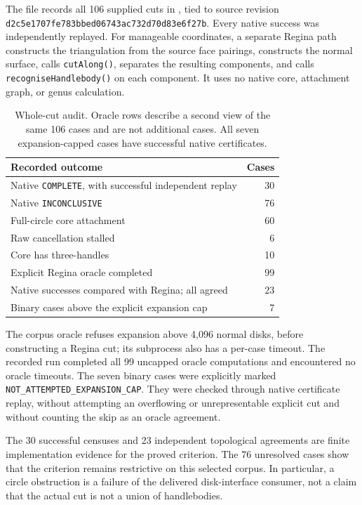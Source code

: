 The file  records all 106 supplied cuts in
, tied to source revision
\texttt{d2c5e1707fe783bbed06743ac732d70d83e6f27b}.  Every native success was
independently replayed.  For manageable coordinates, a separate Regina path
constructs the triangulation from the source face pairings, constructs the
normal surface, calls \texttt{cutAlong()}, separates the resulting components,
and calls \texttt{recogniseHandlebody()} on each component.  It uses no native
core, attachment graph, or genus calculation.

\begin{table}[htbp]
\centering
\small
\begin{tabular}{@{}lr@{}}
\toprule
Recorded outcome & Cases \\
\midrule
Native \texttt{COMPLETE}, with successful independent replay & 30 \\
Native \texttt{INCONCLUSIVE} & 76 \\
\quad Full-circle core attachment & 60 \\
\quad Raw cancellation stalled & 6 \\
\quad Core has three-handles & 10 \\
\midrule
Explicit Regina oracle completed & 99 \\
Native successes compared with Regina; all agreed & 23 \\
Binary cases above the explicit expansion cap & 7 \\
\bottomrule
\end{tabular}
\caption{Whole-cut audit.  Oracle rows describe a second view of the same
106 cases and are not additional cases.  All seven expansion-capped cases
have successful native certificates.}
\label{main:exp-census-counts}
\end{table}

The corpus oracle refuses expansion above 4,096 normal disks, before
constructing a Regina cut; its subprocess also has a per-case timeout.
The recorded run completed all 99 uncapped oracle computations and encountered
no oracle timeouts.  The seven binary cases were explicitly marked
\texttt{NOT\_ATTEMPTED\_EXPANSION\_CAP}.  They were checked through native
certificate replay, without attempting an overflowing or unrepresentable
explicit cut and without counting the skip as an oracle agreement.

The 30 successful censuses and 23 independent topological agreements are
finite implementation evidence for the proved criterion.  The 76 unresolved
cases show that the criterion remains restrictive on this selected corpus.
In particular, a circle obstruction is a failure of the delivered
disk-interface consumer, not a claim that the actual cut is not a union of
handlebodies.


